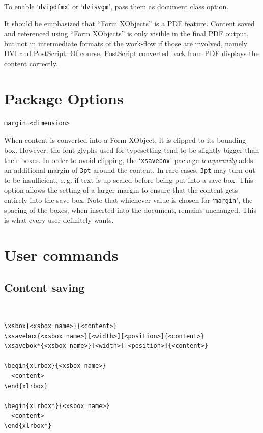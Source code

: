 \documentclass[a4paper]{article}
\begin{document}
To enable `\verb+dvipdfmx+' or `\verb+dvisvgm+', pass them as document class option.

It should be emphasized that \enquote{Form XObjects} is a PDF feature. Content saved and referenced using \enquote{Form XObjects} is only visible in the final PDF output, but not in intermediate formats of the work-flow if those are involved, namely DVI and PostScript. Of course, PostScript converted back from PDF displays the content correctly.

\section{Package Options}
\begin{Verbatim}
margin=<dimension>  
\end{Verbatim}
When content is converted into a Form XObject, it is clipped to its bounding box. However, the font glyphs used for typesetting tend to be slightly bigger than their boxes. In order to avoid clipping, the `\verb+xsavebox+' package \emph{temporarily} adds an additional margin of \verb+3pt+ around the content. In rare cases, \verb+3pt+ may turn out to be insufficient, e.\,g. if text is up-scaled before being put into a save box. This option allows the setting of a larger margin to ensure that the content gets entirely into the save box. Note that whichever value is chosen for `\verb+margin+', the spacing of the boxes, when inserted into the document, remains unchanged. This is what every user definitely wants.

\section{User commands}
\subsection*{Content saving}
\vspace{-1\baselineskip}
\hrulefill\\[-1.6\baselineskip]
\begin{Verbatim}
\xsbox{<xsbox name>}{<content>}
\xsavebox{<xsbox name>}[<width>][<position>]{<content>}
\xsavebox*{<xsbox name>}[<width>][<position>]{<content>}

\begin{xlrbox}{<xsbox name>}
  <content>
\end{xlrbox}

\begin{xlrbox*}{<xsbox name>}
  <content>
\end{xlrbox*}
\end{Verbatim}
\vspace{-1\baselineskip}
\hrulefill\\[-1\baselineskip]
\end{document}
